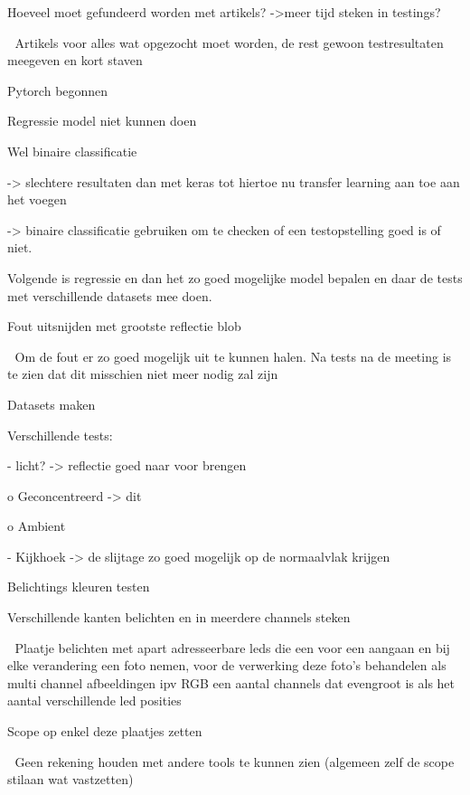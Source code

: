 \documentclass{scrartcl}
\begin{document}
	Hoeveel moet gefundeerd worden met artikels? -\textgreater{}meer tijd steken in testings?
	
	Artikels voor alles wat opgezocht moet worden, de rest gewoon testresultaten meegeven en kort staven

		

Pytorch begonnen

	Regressie model niet kunnen doen
	
	

	Wel binaire classificatie 
	
-\textgreater{} slechtere resultaten dan met keras tot hiertoe nu transfer learning aan toe aan het voegen

-\textgreater{} binaire classificatie gebruiken om te checken of een testopstelling goed is of niet.



Volgende is regressie en dan het zo goed mogelijke model bepalen en daar de tests met verschillende datasets mee doen.



Fout uitsnijden met grootste reflectie blob

	Om de fout er zo goed mogelijk uit te kunnen halen. Na tests na de meeting is te zien dat dit misschien niet meer nodig zal zijn





Datasets maken

	Verschillende tests:
	
-	licht? -\textgreater{} reflectie goed naar voor brengen

o	Geconcentreerd -\textgreater{} dit

o	Ambient 

-	Kijkhoek -\textgreater{} de slijtage zo goed mogelijk op de normaalvlak krijgen

Belichtings kleuren testen



Verschillende kanten belichten en in meerdere channels steken

	Plaatje belichten met apart adresseerbare leds die een voor een aangaan en bij elke verandering een foto nemen, voor de verwerking deze foto’s behandelen als multi channel afbeeldingen ipv RGB een aantal channels dat evengroot is als het aantal verschillende led posities



Scope op enkel deze plaatjes zetten

	Geen rekening houden met andere tools te kunnen zien (algemeen zelf de scope stilaan wat vastzetten) 
\end{document}
